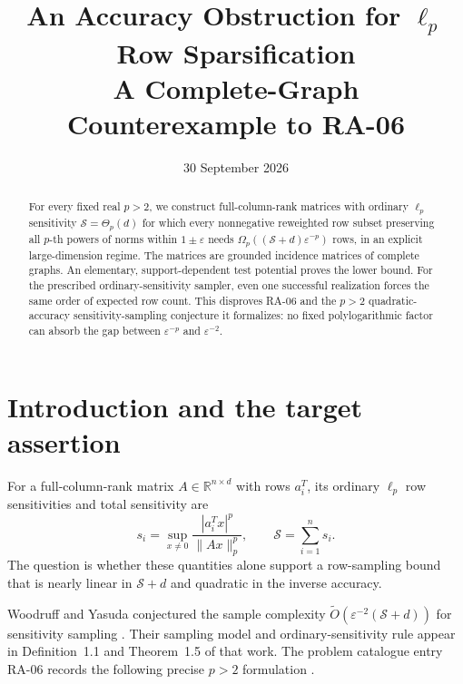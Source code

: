 \documentclass[11pt]{article}
\title{An Accuracy Obstruction for $\ell_p$ Row Sparsification\\[4pt]
  \large A Complete-Graph Counterexample to RA-06}
\author{}
\date{30 September 2026}
\theoremstyle{spaced}
\numberwithin{equation}{section}
\newcommand{\R}{\mathbb{R}}
\newcommand{\Sp}{\mathcal{S}}
\begin{document}
\maketitle

\begin{abstract}
For every fixed real $p>2$, we construct full-column-rank matrices with
ordinary $\ell_p$ sensitivity $\Sp=\Theta_p(d)$ for which every
nonnegative reweighted row subset preserving all $p$-th powers of norms
within $1\pm\varepsilon$ needs
$\Omega_p((\Sp+d)\varepsilon^{-p})$ rows, in an explicit large-dimension
regime. The matrices are grounded incidence matrices of complete graphs.
An elementary, support-dependent test potential proves the lower bound.
For the prescribed ordinary-sensitivity sampler, even one successful
realization forces the same order of expected row count. This disproves
RA-06 and the $p>2$ quadratic-accuracy sensitivity-sampling conjecture it
formalizes: no fixed polylogarithmic factor can absorb the gap between
$\varepsilon^{-p}$ and $\varepsilon^{-2}$.
\end{abstract}

\section{Introduction and the target assertion}\label{sec:introduction}

For a full-column-rank matrix $A\in\R^{n\times d}$ with rows $a_i^T$,
its ordinary $\ell_p$ row sensitivities and total sensitivity are
\begin{equation}\label{eq:sensitivity-definition}
 s_i=\sup_{x\ne0}\frac{|a_i^Tx|^p}{\|Ax\|_p^p},
 \qquad
 \Sp=\sum_{i=1}^n s_i.
\end{equation}
The question is whether these quantities alone support a row-sampling
bound that is nearly linear in $\Sp+d$ and quadratic in the inverse
accuracy.

Woodruff and Yasuda conjectured the sample complexity
$\widetilde O(\varepsilon^{-2}(\Sp+d))$ for sensitivity sampling
\cite[Section~3]{wy}. Their sampling model and ordinary-sensitivity rule
appear in Definition~1.1 and Theorem~1.5 of that work. The problem
catalogue entry RA-06 records the following precise $p>2$ formulation
\cite{ra06}.
\end{document}
